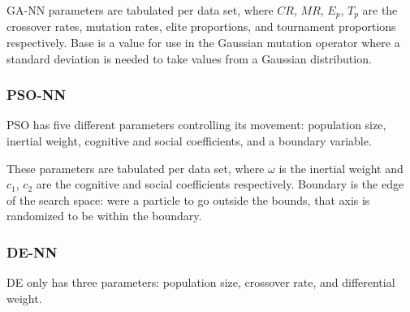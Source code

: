 \documentclass[a4paper,12pt]{article}
\begin{document}
GA-NN parameters are tabulated per data set, where $CR$, $MR$, $E_p$, $T_p$ are the crossover rates, mutation rates, elite proportions, and tournament proportions respectively. Base is a value for use in the Gaussian mutation operator where a standard deviation is needed to take values from a Gaussian distribution.

\subsubsection{PSO-NN}

PSO has five different parameters controlling its movement: population size, inertial weight, cognitive and social coefficients, and a boundary variable.

\begin{table}[h!]
\centering
{}
\caption{Particle swarm optimization parameters.}
\label{Tab:pso-par}
\end{table}

These parameters are tabulated per data set, where $\omega$ is the inertial weight and $c_1$, $c_2$ are the cognitive and social coefficients respectively. Boundary is the edge of the search space: were a particle to go outside the bounds, that axis is randomized to be within the boundary.

\subsubsection{DE-NN}

DE only has three parameters: population size, crossover rate, and differential weight.
\end{document}
